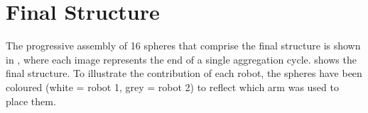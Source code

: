 \section{Final Structure}\label{sec:final_struct}

    The progressive assembly of 16 spheres that comprise the final structure is shown in , where each image represents the end of a single aggregation cycle.  shows the final structure. To illustrate the contribution of each robot, the spheres have been coloured (white = robot 1, grey = robot 2) to reflect which arm was used to place them.
  
